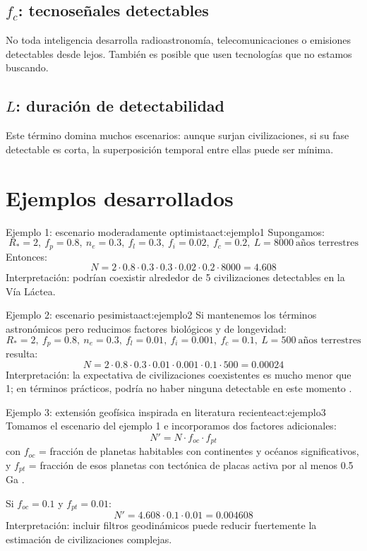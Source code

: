 \documentclass[12pt,oneside]{book}
\begin{document}
\subsection{$f_c$: tecnoseñales detectables}
No toda inteligencia desarrolla radioastronomía, telecomunicaciones o emisiones detectables desde lejos. También es posible que usen tecnologías que no estamos buscando.

\subsection{$L$: duración de detectabilidad}
Este término domina muchos escenarios: aunque surjan civilizaciones, si su fase detectable es corta, la superposición temporal entre ellas puede ser mínima.

\section{Ejemplos desarrollados}

\begin{actividad}{Ejemplo 1: escenario moderadamente optimista}{act:ejemplo1}
Supongamos:
\[
R_* = 2,\ f_p = 0.8,\ n_e = 0.3,\ f_l = 0.3,\ f_i = 0.02,\ f_c = 0.2,\ L = 8000\ \text{años terrestres}
\]
Entonces:
\[
N = 2 \cdot 0.8 \cdot 0.3 \cdot 0.3 \cdot 0.02 \cdot 0.2 \cdot 8000 = 4.608
\]
Interpretación: podrían coexistir alrededor de 5 civilizaciones detectables en la Vía Láctea.
\end{actividad}

\begin{actividad}{Ejemplo 2: escenario pesimista}{act:ejemplo2}
Si mantenemos los términos astronómicos pero reducimos factores biológicos y de longevidad:
\[
R_* = 2,\ f_p = 0.8,\ n_e = 0.3,\ f_l = 0.01,\ f_i = 0.001,\ f_c = 0.1,\ L = 500\ \text{años terrestres}
\]
resulta:
\[
N = 2 \cdot 0.8 \cdot 0.3 \cdot 0.01 \cdot 0.001 \cdot 0.1 \cdot 500 = 0.00024
\]
Interpretación: la expectativa de civilizaciones coexistentes es mucho menor que 1; en términos prácticos, podría no haber ninguna detectable en este momento \cite{baak2026implicationspessimisticlowerlimit}.
\end{actividad}

\begin{actividad}{Ejemplo 3: extensión geofísica inspirada en literatura reciente}{act:ejemplo3}
Tomamos el escenario del ejemplo 1 e incorporamos dos factores adicionales:
\[
N' = N \cdot f_{oc} \cdot f_{pt}
\]
con $f_{oc}$ = fracción de planetas habitables con continentes y océanos significativos, y $f_{pt}$ = fracción de esos planetas con tectónica de placas activa por al menos 0.5 Ga \cite{stern2024tectonics}.

Si $f_{oc} = 0.1$ y $f_{pt} = 0.01$:
\[
N' = 4.608 \cdot 0.1 \cdot 0.01 = 0.004608
\]
Interpretación: incluir filtros geodinámicos puede reducir fuertemente la estimación de civilizaciones complejas.
\end{actividad}
\end{document}
